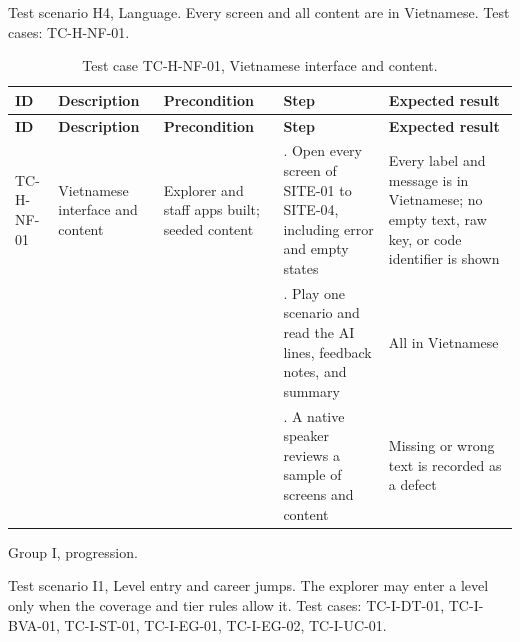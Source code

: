 Test scenario H4, Language. Every screen and all content are in Vietnamese. Test cases: TC-H-NF-01.

{\small
\begin{longtable}{|>{\raggedright\arraybackslash}p{}|>{\raggedright\arraybackslash}p{}|>{\raggedright\arraybackslash}p{}|>{\raggedright\arraybackslash}p{}|>{\raggedright\arraybackslash}p{}|}
\caption{Test case TC-H-NF-01, Vietnamese interface and content.} \\
\hline
\textbf{ID} & \textbf{Description} & \textbf{Precondition} & \textbf{Step} & \textbf{Expected result} \\ \hline
\endfirsthead
\hline
\textbf{ID} & \textbf{Description} & \textbf{Precondition} & \textbf{Step} & \textbf{Expected result} \\ \hline
\endhead
TC-H-NF-01 & Vietnamese interface and content & Explorer and staff apps built; seeded content & 1. Open every screen of SITE-01 to SITE-04, including error and empty states & Every label and message is in Vietnamese; no empty text, raw key, or code identifier is shown \\ \hline
 &  &  & 2. Play one scenario and read the AI lines, feedback notes, and summary & All in Vietnamese \\ \hline
 &  &  & 3. A native speaker reviews a sample of screens and content & Missing or wrong text is recorded as a defect \\ \hline
\end{longtable}
}

Group I, progression.

Test scenario I1, Level entry and career jumps. The explorer may enter a level only when the coverage and tier rules allow it. Test cases: TC-I-DT-01, TC-I-BVA-01, TC-I-ST-01, TC-I-EG-01, TC-I-EG-02, TC-I-UC-01.


